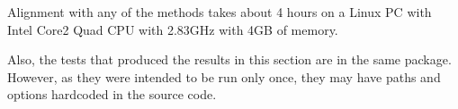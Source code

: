 Alignment with any of the methods takes about 4 hours on a Linux PC with Intel Core2 Quad CPU with 2.83GHz with 4GB of memory.

Also, the tests that produced the results in this section are in the same package. However, as they were intended to be run only once, they may have paths and options hardcoded in the source code.
